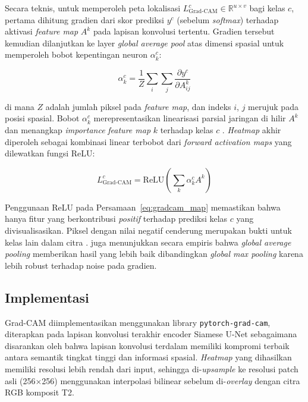 Secara teknis, untuk memperoleh peta lokalisasi $L^c_{\text{Grad-CAM}} \in \mathbb{R}^{u \times v}$ bagi kelas $c$, pertama dihitung gradien dari skor prediksi $y^c$ (sebelum \textit{softmax}) terhadap aktivasi \textit{feature map} $A^k$ pada lapisan konvolusi tertentu. Gradien tersebut kemudian dilanjutkan ke layer \textit{global average pool} atas dimensi spasial untuk memperoleh bobot kepentingan neuron $\alpha^c_k$:

\begin{equation}
	\alpha^c_k = \frac{1}{Z} \sum_i \sum_j \frac{\partial y^c}{\partial A^k_{ij}}
	\label{eq:gradcam_weight}
\end{equation}

\noindent di mana $Z$ adalah jumlah piksel pada \textit{feature map}, dan indeks $i$, $j$ merujuk pada posisi spasial. Bobot $\alpha^c_k$ merepresentasikan linearisasi parsial jaringan di hilir $A^k$ dan menangkap \textit{importance} \textit{feature map} $k$ terhadap kelas $c$ \citep{DBLP:journals/corr/SelvarajuDVCPB16}. \textit{Heatmap} akhir diperoleh sebagai kombinasi linear terbobot dari \textit{forward activation maps} yang dilewatkan fungsi ReLU:

\begin{equation}
	L^c_{\text{Grad-CAM}} = \text{ReLU}\!\left(\sum_k \alpha^c_k A^k\right)
	\label{eq:gradcam_map}
\end{equation}

Penggunaan ReLU pada Persamaan~\ref{eq:gradcam_map} memastikan bahwa hanya fitur yang berkontribusi \textit{positif} terhadap prediksi kelas $c$ yang divisualisasikan. Piksel dengan nilai negatif cenderung merupakan bukti untuk kelas lain dalam citra \citep{DBLP:journals/corr/SelvarajuDVCPB16}. \cite{DBLP:journals/corr/SelvarajuDVCPB16} juga menunjukkan secara empiris bahwa \textit{global average pooling} memberikan hasil yang lebih baik dibandingkan \textit{global max pooling} karena lebih robust terhadap noise pada gradien.

\subsection{Implementasi}

Grad-CAM diimplementasikan menggunakan library \texttt{pytorch-grad-cam}, diterapkan pada lapisan konvolusi terakhir encoder Siamese U-Net sebagaimana disarankan oleh \cite{DBLP:journals/corr/SelvarajuDVCPB16} bahwa lapisan konvolusi terdalam memiliki kompromi terbaik antara semantik tingkat tinggi dan informasi spasial. \textit{Heatmap} yang dihasilkan memiliki resolusi lebih rendah dari input, sehingga di-\textit{upsample} ke resolusi patch asli (256$\times$256) menggunakan interpolasi bilinear sebelum di-\textit{overlay} dengan citra RGB komposit T2.

